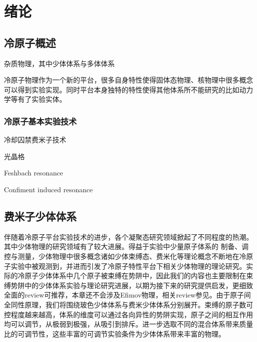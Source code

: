 \chapter{绪论}\label{chap:kondo}

\section{冷原子概述}

杂质物理，其中少体体系与多体体系

冷原子物理作为一个新的平台，很多自身特性使得固体态物理、核物理中很多概念可以得到实验实现。同时平台本身独特的特性使得其他体系所不能研究的比如动力学等有了实验实体。

\subsection{冷原子基本实验技术}

冷却囚禁费米子技术

光晶格

Feshbach resonance

Confiment induced resonance

\section{费米子少体体系}\label{sec:fewbody}
伴随着冷原子平台实验技术的进步，各个凝聚态研究领域掀起了不同程度的热潮。其中少体物理的研究领域有了较大进展。得益于实验中少量原子体系的
制备、调控与测量，少体物理中很多概念诸如少体束缚态、费米化等理论概念不断地在冷原子实验中被观测到，并进而引发了冷原子特性平台下相关少体物理的理论研究。实际的冷原子少体体系中几个原子被束缚在势阱中，因此我们的内容也主要限制在束缚势阱中的少体体系实验与理论研究进展，以期为接下来的研究提供启发，更细致全面的review可推荐\cite{sowinski2019one,blume2012few}，本章还不会涉及Efimov物理，相关review参见\cite{nielsen2001three,braaten2006universality,KohlerMolFRRMP}。由于原子间全同性原理，我们将围绕玻色少体体系与费米少体体系分别展开。束缚的原子数可控程度越来越高，体系的维度可以通过各向异性的势阱实现，原子之间的相互作用均可以调节，从极弱到极强，从吸引到排斥。进一步选取不同的混合体系带来质量比的可调节性，这些丰富的可调节实验条件为少体体系带来丰富的物理。

